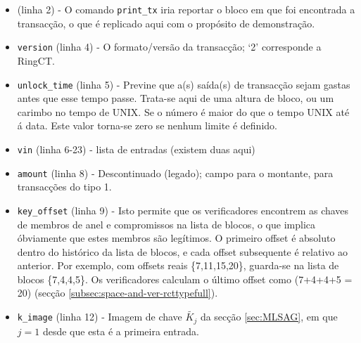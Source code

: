 \begin{appendices}
\begin{itemize}
    \item (linha 2) - O comando {\tt print\_tx} iria reportar o bloco em que foi encontrada a transacção, o que é replicado aqui com o propósito de demonstração.  
	\item {\tt version} (linha 4) - O formato/versão da transacção; `2' corresponde a RingCT.
	\item {\tt unlock\_time} (linha 5) - Previne que a(s) saída(s) de transacção sejam gastas antes que esse tempo passe. Trata-se aqui de uma altura de bloco, ou um carimbo no tempo de UNIX. Se o número é maior do que o tempo UNIX até á data. Este valor torna-se zero se nenhum limite é definido.  
	\item {\tt vin} (linha 6-23) - lista de entradas (existem duas aqui)
	\item {\tt amount} (linha 8) - Descontinuado (legado); campo para o montante, para transacções do tipo 1.
	\item {\tt key\_offset} (linha 9) - Isto permite que os verificadores encontrem as chaves de membros de anel e compromissos na lista de blocos, o que implica óbviamente que estes membros são legítimos. O primeiro offset é absoluto dentro do histórico da lista de blocos, e cada offset subsequente é relativo ao anterior. Por exemplo, com offsets reais \{7,11,15,20\}, guarda-se na lista de blocos \{7,4,4,5\}. Os verificadores calculam o último offset como (7+4+4+5 = 20) (secção \ref{subsec:space-and-ver-rcttypefull}).
	\item {\tt k\_image} (linha 12) - Imagem de chave \(\tilde{K_j}\) da secção \ref{sec:MLSAG}, em que $j = 1$ desde que esta é a primeira entrada.  

\end{itemize}
\end{appendices}
